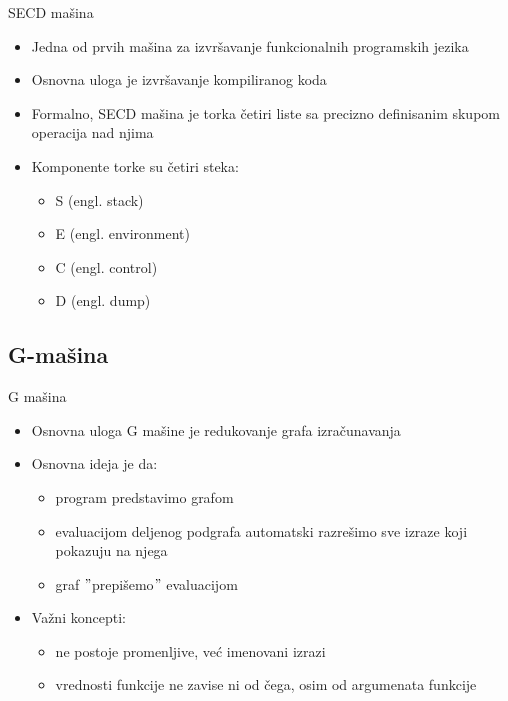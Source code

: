 \documentclass[xcolor={dvipsnames}, 11pt]{beamer}
\begin{document}
\begin{frame}{SECD mašina}
	\begin{itemize}
	\item Jedna od prvih mašina za izvršavanje funkcionalnih programskih jezika
	\item Osnovna uloga je izvršavanje kompiliranog koda
	\item Formalno, SECD mašina je torka četiri liste sa precizno definisanim skupom operacija nad njima
	\item Komponente torke su četiri steka: 
		\begin{itemize}
		\item S (engl. stack)
		\item E (engl. environment)
		\item C (engl. control)
		\item D	(engl. dump)
		\end{itemize}
	\end{itemize}
	
\end{frame}

\subsection{G-mašina}
\begin{frame}{G mašina}
	\begin{itemize}
		\item Osnovna uloga G mašine je redukovanje grafa izračunavanja
		\item Osnovna ideja je da: 
			\begin{itemize}
			\item program predstavimo grafom
			\item evaluacijom deljenog podgrafa automatski razrešimo sve izraze koji pokazuju na njega
			\item graf $"$prepišemo$"$ evaluacijom
			\end{itemize}
		\item Važni koncepti:
			\begin{itemize}
			\item ne postoje promenljive, već imenovani izrazi
			\item vrednosti funkcije ne zavise ni od čega, osim od argumenata funkcije
			\end{itemize}				
	\end{itemize}
\end{frame}

\end{document}
